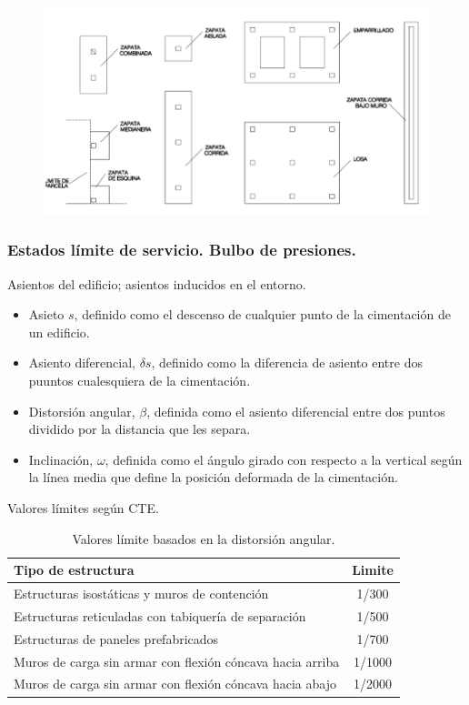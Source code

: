 \begin{figure}[H]
    \centering
    \includegraphics[width=1\linewidth]{Imagenes/Cimentaciones superficiales - Tipos.png}
\end{figure}

\subsubsection{Estados límite de servicio. Bulbo de presiones.}
Asientos del edificio; asientos inducidos en el entorno.
\begin{itemize}
    \item Asieto $s$, definido como el descenso de cualquier punto de la cimentación de un edificio.
    \item Asiento diferencial, $\delta s$, definido como la diferencia de asiento entre dos puuntos cualesquiera de la cimentación.
    \item Distorsión angular, $\beta$, definida como el asiento diferencial entre dos puntos dividido por la distancia que les separa.
    \item Inclinación, $\omega$, definida como el ángulo girado con respecto a la vertical según la línea media que define la posición deformada de la cimentación.
\end{itemize}

Valores límites según CTE.
\begin{table}[H]
    \centering
    \begin{tabular}{p{6cm}|c}
         \hline
         \textbf{Tipo de estructura} & \textbf{Limite} \\
         \hline
         Estructuras isostáticas y muros de contención & 1/300 \\
         Estructuras reticuladas con tabiquería de separación & 1/500 \\
         Estructuras de paneles prefabricados & 1/700 \\
         Muros de carga sin armar con flexión cóncava hacia arriba & 1/1000 \\
         Muros de carga sin armar con flexión cóncava hacia abajo & 1/2000 \\
         \hline
    \end{tabular}
    \caption{Valores límite basados en la distorsión angular.}
\end{table}


